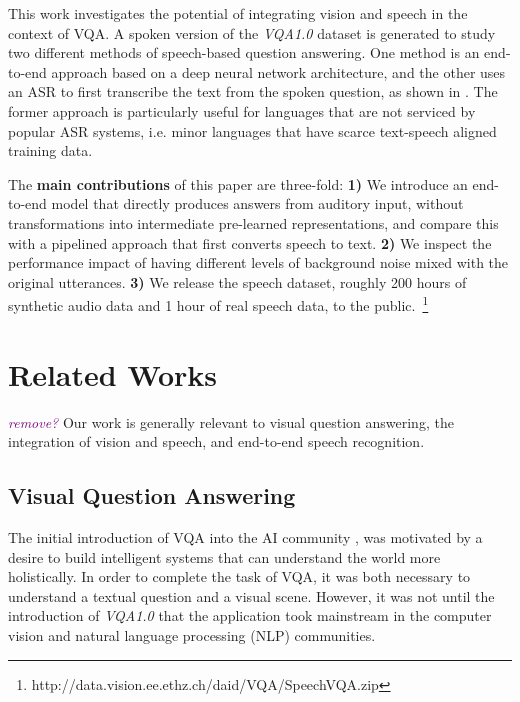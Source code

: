 \documentclass[letterpaper]{article} %
\newcommand{\tz}[1]{\textcolor{purple}{\textit{#1}}}
\begin{document}
This work investigates the potential of integrating vision and speech in the context of VQA. A spoken version of the \textit{VQA1.0} dataset is generated to study two different methods of speech-based question answering. One method is an end-to-end approach based on a deep neural network architecture, and the other uses an ASR to first transcribe the text from the spoken question, as shown in . The former approach is particularly useful for languages that are not serviced by popular ASR systems, i.e. minor languages that have scarce text-speech aligned training data.

The \textbf{main contributions} of this paper are three-fold: \textbf{1)} We introduce an end-to-end model that directly produces answers from auditory input, without transformations into intermediate pre-learned representations, and compare this with a pipelined approach that first converts speech to text. \textbf{2)} We inspect the performance impact of having different levels of background noise mixed with the original utterances. \textbf{3)} We release the speech dataset, roughly 200 hours of synthetic audio data and 1 hour of real speech data, to the public.~\footnote{http://data.vision.ee.ethz.ch/daid/VQA/SpeechVQA.zip}


\section{Related Works}
\tz{remove?}
Our work is generally relevant to visual question answering, the integration of vision and speech, and end-to-end speech recognition.

\subsection{Visual Question Answering}
The initial introduction of VQA into the AI community \cite{realtime:vqa}, \cite{daquar} was motivated by a desire to build intelligent systems that can understand the world more holistically. In order to complete the task of VQA, it was both necessary to understand a textual question and a visual scene. However, it was not until the introduction of \textit{VQA1.0} \cite{VQA} that the application took mainstream in the computer vision and natural language processing (NLP) communities.
\end{document}
